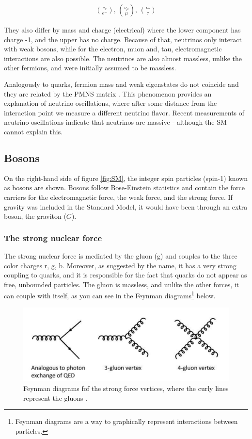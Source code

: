 \begin{align}
    \binom{\nu_e}{e^-} \text{,  } \binom{\nu_\mu}{\mu} \text{,  } \binom{\nu_\tau}{\tau}
\end{align}

They also differ by mass and charge (electrical) where the lower component has charge -1, and the upper has no charge. Because of that, neutrinos only interact with weak bosons, while for the electron, muon and, tau, electromagnetic interactions are also possible. The neutrinos are also almost massless, unlike the other fermions, and were initially assumed to be massless. 

Analogously to quarks, fermion mass and weak eigenstates do not coincide and they are related by the PMNS matrix \cite{thomson}. This phenomenon provides an explanation of neutrino oscillations, where after some distance from the interaction point we measure a different neutrino flavor. Recent measurements of neutrino oscillations indicate that neutrinos are massive - although the SM cannot explain this. 


\subsection{Bosons}
On the right-hand side of figure \ref{fig:SM}, the integer spin particles (spin-1) known as bosons \cite{thomson} are shown. Bosons follow Bose-Einstein statistics and contain the force carriers for the electromagnetic force, the weak force, and the strong force. If gravity was included in the Standard Model, it would have been through an extra boson, the graviton ($G$).

\subsubsection{The strong nuclear force}
The strong nuclear force is mediated by the gluon (g) \cite{thomson} and couples to the three color charges r, g, b. Moreover, as suggested by the name, it has a very strong coupling to quarks, and it is responsible for the fact that quarks do not appear as free, unbounded particles. The gluon is massless, and unlike the other forces, it can couple with itself, as you can see in the Feynman diagrams\footnote{Feynman diagrams are a way to graphically represent interactions between particles.} below.

\begin{figure}[H]
    \centering
    \includegraphics[width = \textwidth]{Figures/FeynmanDiagrams/gluon.pdf}
    \caption{Feynman diagrams fof the strong force vertices, where the curly lines represent the gluons \cite{STRONGforce}.}
    \label{fig:my_label}
\end{figure}

